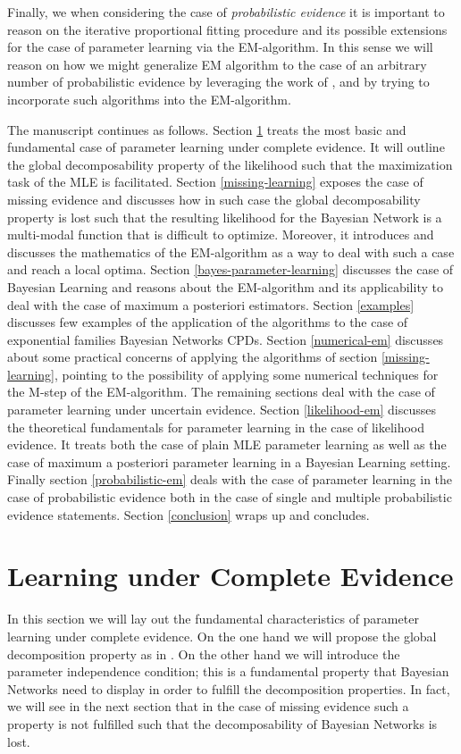 \documentclass[11pt]{article}
\begin{document}
\begin{article}
Finally, we when considering the case of \emph{probabilistic evidence}
it is important to reason on the iterative proportional fitting
procedure and its possible extensions for the case of parameter
learning via the EM-algorithm. In this sense we will reason on how
we might generalize EM algorithm to the case of an arbitrary number
of probabilistic evidence by leveraging the work of \cite{PENG_2010},
\cite{meng2016method} and by trying to incorporate such algorithms
into the EM-algorithm.

The manuscript continues as follows. Section \ref{complete-learning}
treats the most basic and fundamental case of parameter learning
under complete evidence. It will outline the global decomposability
property of the likelihood such that the maximization task of the
MLE is facilitated. Section \ref{missing-learning} exposes the case of
missing evidence and discusses how in such case the global
decomposability property is lost such that the resulting likelihood
for the Bayesian Network is a multi-modal function that is
difficult to optimize. Moreover, it introduces and discusses the
mathematics of the EM-algorithm as a way to deal with such a case
and reach a local optima. Section \ref{bayes-parameter-learning}
discusses the case of Bayesian Learning and reasons about the
EM-algorithm and its applicability to deal with the case of maximum
a posteriori estimators. Section \ref{examples} discusses few examples
of the application of the algorithms to the case of exponential
families Bayesian Networks CPDs.  Section \ref{numerical-em} discusses
about some practical concerns of applying the algorithms of section
\ref{missing-learning}, pointing to the possibility of applying some
numerical techniques for the M-step of the EM-algorithm. The
remaining sections deal with the case of parameter learning under
uncertain evidence. Section \ref{likelihood-em} discusses the
theoretical fundamentals for parameter learning in the case of
likelihood evidence. It treats both the case of plain MLE parameter
learning as well as the case of maximum a posteriori parameter
learning in a Bayesian Learning setting. Finally section
\ref{probabilistic-em} deals with the case of parameter learning in the
case of probabilistic evidence both in the case of single and
multiple probabilistic evidence statements. Section \ref{conclusion}
wraps up and concludes.

\newpage


\section{Learning under Complete Evidence}
\label{complete-learning}
In this section we will lay out the fundamental characteristics of
parameter learning under complete evidence. On the one hand we will
propose the global decomposition property as in
\cite{spiegelhalter1990sequential}. On the other hand we will
introduce the parameter independence condition; this is a
fundamental property that Bayesian Networks need to display in order
to fulfill the decomposition properties. In fact, we will see in the
next section that in the case of missing evidence such a property is
not fulfilled such that the decomposability of Bayesian Networks is
lost.


\end{article}
\end{document}
